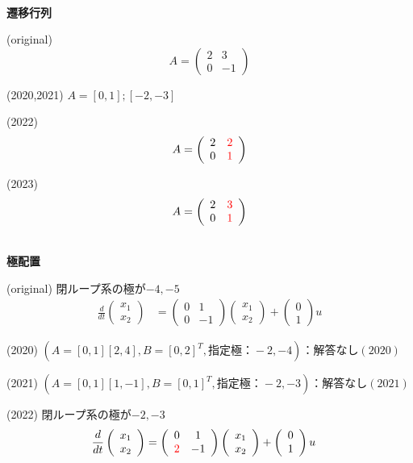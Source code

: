 \documentclass[a4paper,11pt,fleqn]{jreport}
\begin{document}
\ \\ \noindent
{\bf 遷移行列}

(original)
\[
	A= \left(\begin{array}{cc}
		2 & 3 \\
		0 & -1
	   \end{array} \right )
\]

(2020,2021) $A=[0,1];[-2,-3]$

(2022)
\[
	A= \left(\begin{array}{cc}
		2 & \color{red} 2 \\
		0 & \color{red} 1
	   \end{array} \right )
\]



(2023)
\[
	A= \left(\begin{array}{cc}
		2 & \color{red} 3 \\
		0 & \color{red} 1
	   \end{array} \right )
\]



\ \\ \noindent
{\bf 極配置}

(original)
閉ループ系の極が$-4,-5$
\begin{align*}
	\frac{d}{dt}
	\left (
	\begin{array}{c}
	 x_1 \\ x_2 
	\end{array}
	\right )
	& = 
	\left (
	\begin{array}{cc}
	 0 & 1 \\
	 0 & -1
	\end{array}
	\right )
	\left (
	\begin{array}{c}
	 x_1 \\ x_2 
	\end{array}
	\right )
	+
	\left (
	\begin{array}{c}
	 0 \\ 1 
	\end{array}
	\right )
	u
\end{align*}

(2020) $(A=[0, 1][2, 4], B=[0, 2]^T, 指定極：-2,-4)：解答なし(2020) $

(2021) $(A=[0, 1][1, -1], B=[0, 1]^T, 指定極：-2,-3)：解答なし(2021)$

(2022)
閉ループ系の極が{\color{red}$-2,-3$}
\begin{align*}
	\frac{d}{dt}
	\left (
	\begin{array}{c}
	 x_1 \\ x_2 
	\end{array}
	\right )
	& = 
	\left (
	\begin{array}{cc}
	 0 & 1 \\
	 \color{red} 2 & -1
	\end{array}
	\right )
	\left (
	\begin{array}{c}
	 x_1 \\ x_2 
	\end{array}
	\right )
	+
	\left (
	\begin{array}{c}
	 0 \\ 1 
	\end{array}
	\right )
	u
\end{align*}
\end{document}
